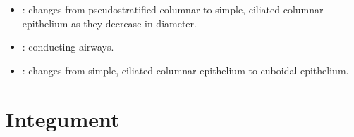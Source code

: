 \begin{multicols}{2}
\begin{itemize}
  \item {}: changes from pseudostratified columnar to simple, ciliated columnar epithelium as they decrease in diameter.
  
  \begin{center}
  \end{center}
  
  \item {}: conducting airways.
  
  \begin{center}
  \end{center}
  
  \item {}: changes from simple, ciliated columnar epithelium to cuboidal epithelium.
  
  \begin{center}
  \end{center}
  
\end{itemize}
\end{multicols}


\newpage
\section{Integument}

